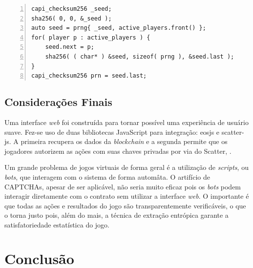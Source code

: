 \documentclass[a4paper,12pt]{monografia}
\theoremstyle{plain}
\theoremstyle{definition}
\theoremstyle{remark}
\begin{document}
\lstset{tabsize=5,language=C++,showstringspaces=false,basicstyle=\ttfamily\small,keywordstyle=\bf,breaklines=true}
\begin{singlespacing}
\begin{lstlisting}[frame=single,framexrightmargin=1pt,numbers=left]
capi_checksum256 _seed;
sha256( 0, 0, &_seed );
auto seed = prng{ _seed, active_players.front() };
for( player p : active_players ) {
    seed.next = p;
    sha256( ( char* ) &seed, sizeof( prng ), &seed.last );
}
capi_checksum256 prn = seed.last;
\end{lstlisting}
\end{singlespacing}

\section{Considera\c{c}\~{o}es Finais}

Uma interface \textit{web} foi constru\'ida para tornar poss\'ivel uma experi\^encia de usu\'ario suave.
Fez-se uso de duas bibliotecas JavaScript para integra\c{c}\~ao: eosjs e scatter-js.
A primeira recupera os dados da \textit{blockchain} e a segunda permite que os jogadores autorizem as a\c{c}\~oes com suas chaves privadas por via do Scatter, .

Um grande problema de jogos virtuais de forma geral \'e a utiliza\c{c}\~ao de \textit{scripts}, ou \textit{bots}, que interagem com o sistema de forma autom\^ata.
O artif\'icio de CAPTCHAs, apesar de ser aplic\'avel, n\~ao seria muito eficaz pois os \textit{bots} podem interagir diretamente com o contrato sem utilizar a interface \textit{web}.
O importante \'e que todas as a\c{c}\~oes e resultados do jogo s\~ao transparentemente verific\'aveis, o que o torna justo pois, al\'em do mais, a t\'ecnica de extra\c{c}\~ao entr\'opica garante a satisfatoriedade estat\'istica do jogo.

\chapter{Conclus\~{a}o}
\end{document}
